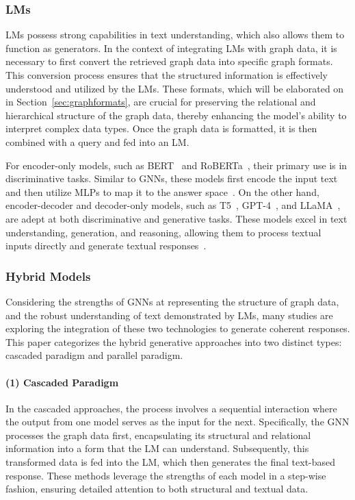 \documentclass[acmsmall]{acmart}
\begin{document}
\subsubsection{LMs}
LMs possess strong capabilities in text understanding, which also allows them to function as generators. In the context of integrating LMs with graph data, it is necessary to first convert the retrieved graph data into specific graph formats. This conversion process ensures that the structured information is effectively understood and utilized by the LMs. These formats, which will be elaborated on in Section~\ref{sec:graphformats}, are crucial for preserving the relational and hierarchical structure of the graph data, thereby enhancing the model's ability to interpret complex data types. Once the graph data is formatted, it is then combined with a query and fed into an LM.

For encoder-only models, such as BERT~\cite{ref:bert} and RoBERTa~\cite{ref:roberta}, their primary use is in discriminative tasks. Similar to GNNs, these models first encode the input text and then utilize MLPs to map it to the answer space~\cite{ref:unikgqa,ref:mvp-tuning,ref:noname2}. On the other hand, encoder-decoder and decoder-only models, such as T5~\cite{ref:t5}, GPT-4~\cite{ref:gpt4}, and LLaMA~\cite{ref:llama3}, are adept at both discriminative and generative tasks. These models excel in text understanding, generation, and reasoning, allowing them to process textual inputs directly and generate textual responses~\cite{ref:graphrag,ref:rok,ref:rog,ref:graphcot,ref:tog,ref:gnn-rag,ref:keqing,ref:hykge}.

\subsubsection{Hybrid Models}
Considering the strengths of GNNs at representing the structure of graph data, and the robust understanding of text demonstrated by LMs, many studies are exploring the integration of these two technologies to generate coherent responses. This paper categorizes the hybrid generative approaches into two distinct types: cascaded paradigm and parallel paradigm.

\paragraph{(1) Cascaded Paradigm} In the cascaded approaches, the process involves a sequential interaction where the output from one model serves as the input for the next. Specifically, the GNN processes the graph data first, encapsulating its structural and relational information into a form that the LM can understand. Subsequently, this transformed data is fed into the LM, which then generates the final text-based response. These methods leverage the strengths of each model in a step-wise fashion, ensuring detailed attention to both structural and textual data. 
\end{document}
